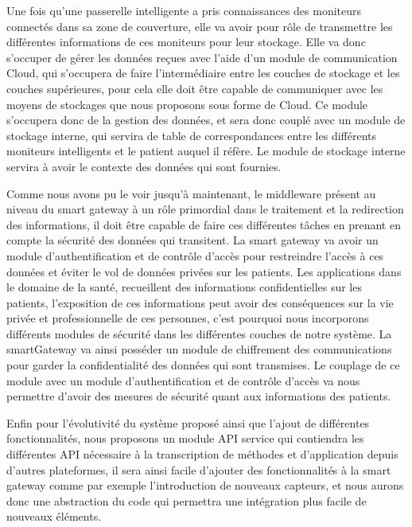 Une fois qu’une passerelle intelligente a pris connaissances des moniteurs connectés dans sa zone de couverture, elle va avoir pour rôle de transmettre les différentes informations de ces moniteurs pour leur stockage. Elle va donc s’occuper de gérer les données reçues avec l’aide d’un module de communication Cloud, qui s’occupera de faire l’intermédiaire entre les couches de stockage et les couches supérieures, pour cela elle doit être capable de communiquer avec les moyens de stockages que nous proposons sous forme de Cloud. Ce module s’occupera donc de la gestion des données, et sera donc couplé avec un module de stockage interne, qui servira de table de correspondances entre les différents moniteurs intelligents et le patient auquel il réfère. Le module de stockage interne servira à avoir le contexte des données qui sont fournies.

Comme nous avons pu le voir jusqu’à maintenant, le middleware présent au niveau du smart gateway à un rôle primordial dans le traitement et la redirection des informations, il doit être capable de faire ces différentes tâches en prenant en compte la sécurité des données qui transitent. La smart gateway va avoir un module d’authentification et de contrôle d’accès pour restreindre l’accès à ces données et éviter le vol de données privées sur les patients. Les applications dans le domaine de la santé, recueillent des informations confidentielles sur les patients, l’exposition de ces informations peut avoir des conséquences sur la vie privée et professionnelle de ces personnes, c’est pourquoi nous incorporons différents modules de sécurité dans les différentes couches de notre système. La smartGateway va ainsi posséder un module de chiffrement des communications pour garder la confidentialité des données qui sont transmises. Le couplage de ce module avec un module d’authentification et de contrôle d’accès va nous permettre d’avoir des mesures de sécurité quant aux informations des patients.

Enfin pour l’évolutivité du système proposé ainsi que l’ajout de différentes fonctionnalités, nous proposons un module API service qui contiendra les différentes API nécessaire à la transcription de méthodes et d’application depuis d’autres plateformes, il sera ainsi facile d’ajouter des fonctionnalités à la smart gateway comme par exemple l’introduction de nouveaux capteurs, et nous aurons donc une abstraction du code qui permettra une intégration plus facile de nouveaux éléments.